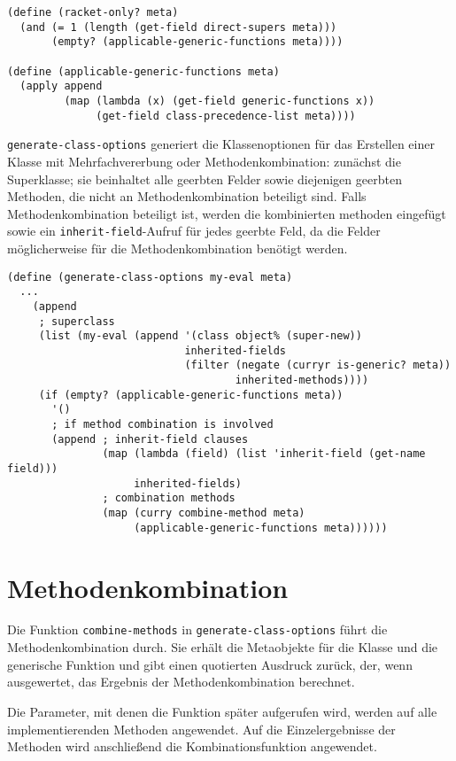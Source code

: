 \begin{lstlisting}
(define (racket-only? meta)
  (and (= 1 (length (get-field direct-supers meta)))
       (empty? (applicable-generic-functions meta))))
       
(define (applicable-generic-functions meta)
  (apply append
         (map (lambda (x) (get-field generic-functions x))
              (get-field class-precedence-list meta))))
\end{lstlisting}

\texttt{generate-class-options} generiert die Klassenoptionen für das Erstellen einer Klasse mit Mehrfachvererbung oder Methodenkombination: zunächst die Superklasse; sie beinhaltet alle geerbten Felder sowie diejenigen geerbten Methoden, die nicht an Methodenkombination beteiligt sind. Falls Methodenkombination beteiligt ist, werden die kombinierten methoden eingefügt sowie ein \texttt{inherit-field}-Aufruf für jedes geerbte Feld, da die Felder möglicherweise für die Methodenkombination benötigt werden.

\begin{lstlisting}
(define (generate-class-options my-eval meta)
  ...
    (append
     ; superclass
     (list (my-eval (append '(class object% (super-new))
                            inherited-fields
                            (filter (negate (curryr is-generic? meta))
                                    inherited-methods))))
     (if (empty? (applicable-generic-functions meta))
       '()
       ; if method combination is involved
       (append ; inherit-field clauses
               (map (lambda (field) (list 'inherit-field (get-name field)))
                    inherited-fields)
               ; combination methods
               (map (curry combine-method meta)
                    (applicable-generic-functions meta))))))
\end{lstlisting}

\section{Methodenkombination}

Die Funktion \texttt{combine-methods} in \texttt{generate-class-options} führt die Methodenkombination durch. Sie erhält die Metaobjekte für die Klasse und die generische Funktion und gibt einen quotierten Ausdruck zurück, der, wenn ausgewertet, das Ergebnis der Methodenkombination berechnet.

Die Parameter, mit denen die Funktion später aufgerufen wird, werden auf alle implementierenden Methoden angewendet. Auf die Einzelergebnisse der Methoden wird anschließend die Kombinationsfunktion angewendet.

